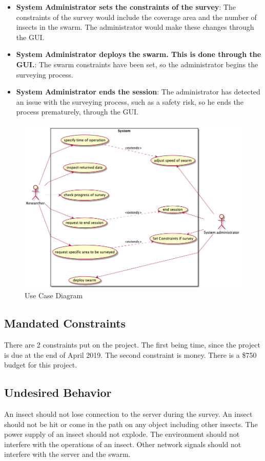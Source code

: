 \documentclass[11pt]{article}
\begin{document}
\begin{itemize}
    \item \textbf{System Administrator sets the constraints of the survey}:
        The constraints of the survey would include the coverage area and the number of
        insects in the swarm. The administrator would make these changes through the GUI.
    \item \textbf{System Administrator deploys the swarm. This is done through the GUI.}:
        The swarm constraints have been set, so the administrator begins the surveying process.
    \item \textbf{System Administrator ends the session}:
        The administrator has detected an issue with the surveying process, such as a safety risk,
        so he ends the process prematurely, through the GUI.

\end{itemize}
\begin{figure}[H]
   \centering
   \includegraphics[width=\textwidth]{diagrams/usecase.png}
   \caption{Use Case Diagram}
   \label{fig:ucd}
\end{figure}

\subsection{Mandated Constraints}
There are 2 constraints put on the project. The first being time, since the project is due at the end of April 2019. The second constraint is money. There is a \$750 budget for this project.
\subsection{Undesired Behavior}
An insect should not lose connection to the server during the survey. An insect should not be hit or come in the path on any object including other insects. The power supply of an insect should not explode. The environment should not interfere with the operations of an insect. Other network signals should not interfere with the server and the swarm. 
\end{document}
